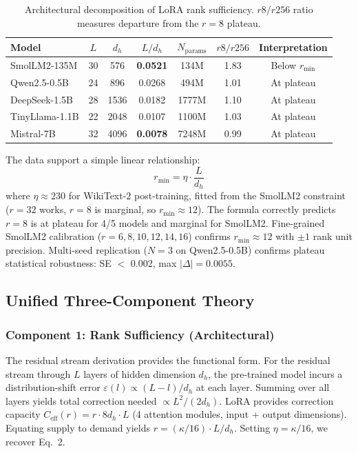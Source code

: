 \documentclass[11pt]{article}
\begin{document}
\begin{table}[h]
\centering
\caption{Architectural decomposition of LoRA rank sufficiency. $r8/r256$ ratio measures departure from the $r=8$ plateau.}
\label{tab:arch_ratio}
\begin{tabular}{@{}lcccccc@{}}
\toprule
\textbf{Model} & $L$ & $d_h$ & $L/d_h$ & $N_{\text{params}}$ & $r8/r256$ & \textbf{Interpretation} \\
\midrule
SmolLM2-135M & 30 & 576 & \textbf{0.0521} & 134M & 1.83 & Below $r_{\min}$ \\
Qwen2.5-0.5B & 24 & 896 & 0.0268 & 494M & 1.01 & At plateau \\
DeepSeek-1.5B & 28 & 1536 & 0.0182 & 1777M & 1.10 & At plateau \\
TinyLlama-1.1B & 22 & 2048 & 0.0107 & 1100M & 1.03 & At plateau \\
Mistral-7B & 32 & 4096 & \textbf{0.0078} & 7248M & 0.99 & At plateau \\
\bottomrule
\end{tabular}
\end{table}

The data support a simple linear relationship:
\begin{equation}
r_{\min} = \eta \cdot \frac{L}{d_h}
\end{equation}
where $\eta \approx 230$ for WikiText-2 post-training, fitted from the SmolLM2 constraint ($r=32$ works, $r=8$ is marginal, so $r_{\min} \approx 12$). The formula correctly predicts $r=8$ is at plateau for 4/5 models and marginal for SmolLM2. Fine-grained SmolLM2 calibration ($r=6,8,10,12,14,16$) confirms $r_{\min} \approx 12$ with $\pm 1$ rank unit precision. Multi-seed replication ($N=3$ on Qwen2.5-0.5B) confirms plateau statistical robustness: SE $<$ 0.002, max $|\Delta| = 0.0055$.

\subsection{Unified Three-Component Theory}

\subsubsection{Component 1: Rank Sufficiency (Architectural)}

The residual stream derivation provides the functional form. For the residual stream through $L$ layers of hidden dimension $d_h$, the pre-trained model incurs a distribution-shift error $\varepsilon(l) \propto (L-l)/d_h$ at each layer. Summing over all layers yields total correction needed $\propto L^2/(2d_h)$. LoRA provides correction capacity $C_{\text{eff}}(r) = r \cdot 8d_h \cdot L$ (4 attention modules, input + output dimensions). Equating supply to demand yields $r = (\kappa/16) \cdot L/d_h$. Setting $\eta = \kappa/16$, we recover Eq.~2.
\end{document}
